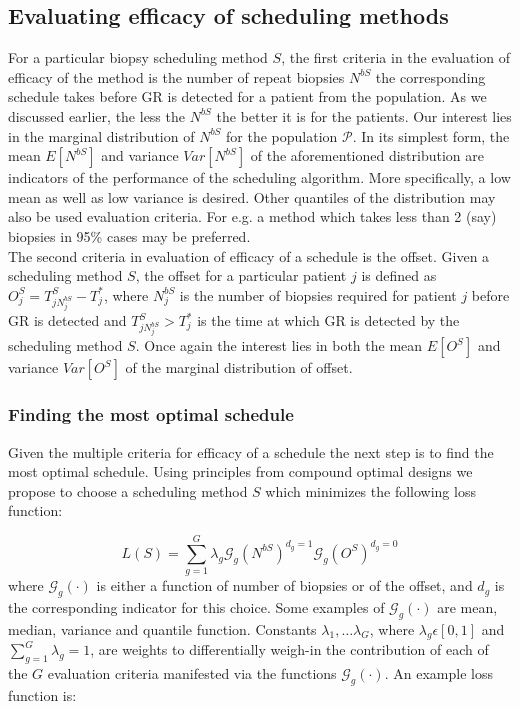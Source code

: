 \subsection{Evaluating efficacy of scheduling methods}
For a particular biopsy scheduling method $S$, the first criteria in the evaluation of efficacy of the method is the number of repeat biopsies $N^{bS}$ the corresponding schedule takes before GR is detected for a patient from the population. As we discussed earlier, the less the $N^{bS}$ the better it is for the patients. Our interest lies in the marginal distribution of $N^{bS}$ for the population $\mathcal{P}$. In its simplest form, the mean $E[N^{bS}]$ and variance $Var[N^{bS}]$ of the aforementioned distribution are indicators of the performance of the scheduling algorithm. More specifically, a low mean as well as low variance is desired. Other quantiles of the distribution may also be used evaluation criteria. For e.g. a method which takes less than 2 (say) biopsies in 95\% cases may be preferred.\\

The second criteria in evaluation of efficacy of a schedule is the offset. Given a scheduling method $S$, the offset for a particular patient $j$ is defined as $O^S_j = T^S_{j{N^{bS}_j}} - T^*_j$, where $N^{bS}_j$ is the number of biopsies required for patient $j$ before GR is detected and $T^S_{j{N^{bS}_j}} > T^*_j$ is the time at which GR is detected by the scheduling method $S$. Once again the interest lies in both the mean $E[O^S]$ and variance $Var[O^S]$ of the marginal distribution of offset.

\subsubsection{Finding the most optimal schedule}
Given the multiple criteria for efficacy of a schedule the next step is to find the most optimal schedule. Using principles from compound optimal designs \citep{lauter1976optimal} we propose to choose a scheduling method $S$ which minimizes the following loss function:

\begin{equation}
\label{eq : loss_func_sim_study_generic}
L(S) = \sum_{g=1}^G \lambda_g \mathcal{G}_g(N^{bS})^{d_g=1}\mathcal{G}_g(O^S)^{d_g=0}
\end{equation}
where $\mathcal{G}_g(\cdot)$ is either a function of number of biopsies or of the offset, and $d_g$ is the corresponding indicator for this choice. Some examples of $\mathcal{G}_g(\cdot)$ are mean, median, variance and quantile function. Constants $\lambda_1, \ldots \lambda_G$, where $\lambda_g \epsilon [0,1]$ and $\sum_{g=1}^G \lambda_g = 1$, are weights to differentially weigh-in the contribution of each of the $G$ evaluation criteria manifested via the functions $\mathcal{G}_g(\cdot)$. An example loss function is:

